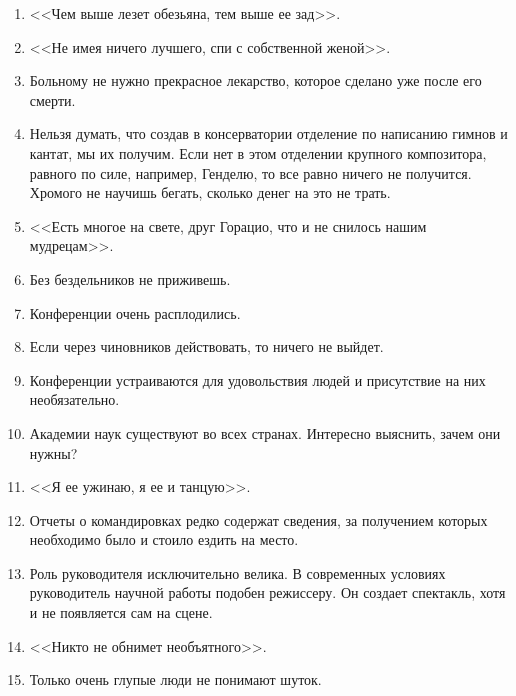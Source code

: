 \documentclass[12pt,a4paper,titlepage]{article}
\begin{document}
\begin{enumerate}
\item <<Чем выше лезет обезьяна, тем выше ее зад>>.
\item <<Не имея ничего лучшего, спи с собственной женой>>.
\item Больному не нужно прекрасное лекарство, которое сделано уже после его смерти.
\item Нельзя думать, что создав в консерватории отделение по написанию гимнов и кантат, мы их получим. Если нет в этом отделении крупного композитора, равного по силе, например, Генделю, то все равно ничего не получится. Хромого не научишь бегать, сколько денег на это не трать.
\item <<Есть многое на свете, друг Горацио, что и не снилось нашим мудрецам>>.
\item Без бездельников не приживешь.
\item Конференции очень расплодились.
\item Если через чиновников действовать, то ничего не выйдет.
\item Конференции устраиваются для удовольствия людей и присутствие на них необязательно.
\item Академии наук существуют во всех странах. Интересно выяснить, зачем они нужны?
\item <<Я ее ужинаю, я ее и танцую>>.
\item Отчеты о командировках редко содержат сведения, за получением которых необходимо было и стоило ездить на место.
\item Роль руководителя исключительно велика. В современных условиях руководитель научной работы подобен режиссеру. Он создает спектакль, хотя и не появляется сам на сцене.
\item <<Никто не обнимет необъятного>>.
\item Только очень глупые люди не понимают шуток.
\end{enumerate}
\end{document}
